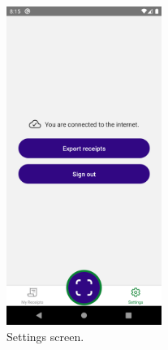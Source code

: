 \documentclass[
  digital, %
  table,   %
  oneside, %
  lof,     %
  lot,     %
]{fithesis3}
\newcommand\half{0.45}
\begin{document}
\begin{figure}
    \begin{center}
        \includegraphics[width=\half\textwidth]{figures/screens/android/light/settings_screen}
    \end{center}
    \caption{Settings screen.}
    \label{fig:settings_screen}
\end{figure}
\end{document}
